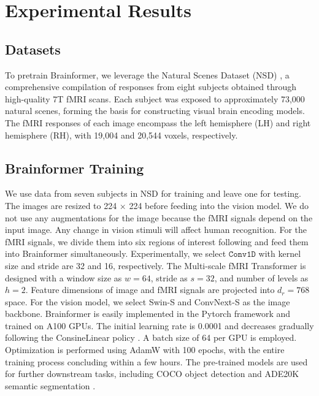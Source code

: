 \section{Experimental Results}

\subsection{Datasets}

To pretrain Brainformer, we leverage the Natural Scenes Dataset (NSD) \cite{allen2022massive}, a comprehensive compilation of responses from eight subjects obtained through high-quality 7T fMRI scans.
Each subject was exposed to approximately 73,000 natural scenes, forming the basis for constructing visual brain encoding models. 
The fMRI responses of each image encompass the left hemisphere (LH) and right hemisphere (RH), with 19,004 and 20,544 voxels, respectively. 


\subsection{Brainformer Training}

We use data from seven subjects in NSD for training and leave one for testing. The images are resized to 224 $\times$ 224 before feeding into the vision model. We do not use any augmentations for the image because the fMRI signals depend on the input image. Any change in vision stimuli will affect human recognition. For the fMRI signals, we divide them into six regions of interest following \cite{algonauts} and feed them into Brainformer simultaneously. Experimentally, we select $\texttt{Conv1D}$ with kernel size and stride are 32 and 16, respectively. The Multi-scale fMRI Transformer is designed with a window size as $w = 64$, stride as $s = 32$, and number of levels as $h=2$. Feature dimensions of image and fMRI signals are projected into $d_r = 768$ space. For the vision model, we select Swin-S \cite{liu2021swin} and ConvNext-S \cite{liu2022convnet} as the image backbone. Brainformer is easily implemented in the Pytorch framework and trained on A100 GPUs. The initial learning rate is 0.0001 and decreases gradually following the ConsineLinear policy \cite{cosine}. A batch size of 64 per GPU is employed. Optimization is performed using AdamW \cite{adamw} with 100 epochs, with the entire training process concluding within a few hours. The pre-trained models are used for further downstream tasks, including COCO object detection \cite{coco} and ADE20K semantic segmentation \cite{ade20k}.

